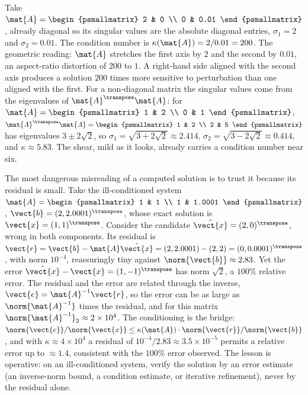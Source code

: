 \begin{example}
Take $\mat{A} = \begin{psmallmatrix} 2 & 0 \\ 0 & 0.01
\end{psmallmatrix}$, already diagonal so its singular values are the
absolute diagonal entries, $\sigma_{1} = 2$ and $\sigma_{2} = 0.01$.
The condition number is $\kappa(\mat{A}) = 2/0.01 = 200$. The
geometric reading: $\mat{A}$ stretches the first axis by $2$ and the
second by $0.01$, an aspect-ratio distortion of $200$ to $1$. A
right-hand side aligned with the second axis produces a solution
$200$ times more sensitive to perturbation than one aligned with the
first. For a non-diagonal matrix the singular values come from the
eigenvalues of $\mat{A}^{\transpose}\mat{A}$: for $\mat{A} =
\begin{psmallmatrix} 1 & 2 \\ 0 & 1 \end{psmallmatrix}$, $\mat{A}^{
\transpose}\mat{A} = \begin{psmallmatrix} 1 & 2 \\ 2 & 5
\end{psmallmatrix}$ has eigenvalues $3 \pm 2\sqrt{2}$, so $\sigma_{1}
= \sqrt{3 + 2\sqrt{2}} \approx 2.414$, $\sigma_{2} = \sqrt{3 -
2\sqrt{2}} \approx 0.414$, and $\kappa \approx 5.83$. The shear,
mild as it looks, already carries a condition number near six.
\end{example}

\begin{example}
The most dangerous misreading of a computed solution is to trust it
because its residual is small. Take the ill-conditioned system
$\mat{A} = \begin{psmallmatrix} 1 & 1 \\ 1 & 1.0001
\end{psmallmatrix}$, $\vect{b} = (2, 2.0001)^{\transpose}$, whose
exact solution is $\vect{x} = (1, 1)^{\transpose}$. Consider the
candidate $\hat{\vect{x}} = (2, 0)^{\transpose}$, wrong in both
components. Its residual is $\vect{r} = \vect{b} - \mat{A}
\hat{\vect{x}} = (2, 2.0001) - (2, 2) = (0, 0.0001)^{\transpose}$,
with norm $10^{-4}$, reassuringly tiny against $\norm{\vect{b}}
\approx 2.83$. Yet the error $\hat{\vect{x}} - \vect{x} = (1,
-1)^{\transpose}$ has norm $\sqrt{2}$, a $100\%$ relative error. The
residual and the error are related through the inverse, $\vect{e} =
\mat{A}^{-1}\vect{r}$, so the error can be as large as
$\norm{\mat{A}^{-1}}$ times the residual, and for this matrix
$\norm{\mat{A}^{-1}}_{2} \approx 2 \times 10^{4}$. The conditioning
is the bridge: $\norm{\vect{e}}/\norm{\vect{x}} \leq \kappa(\mat{A})
\cdot \norm{\vect{r}}/\norm{\vect{b}}$, and with $\kappa \approx 4
\times 10^{4}$ a residual of $10^{-4}/2.83 \approx 3.5 \times
10^{-5}$ permits a relative error up to $\approx 1.4$, consistent
with the $100\%$ error observed. The lesson is operative: on an
ill-conditioned system, verify the solution by an error estimate
(an inverse-norm bound, a condition estimate, or iterative
refinement), never by the residual alone.
\end{example}

